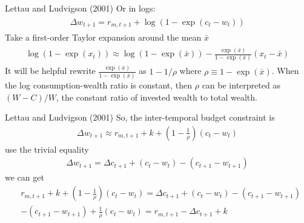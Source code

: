 \documentclass{beamer}
\begin{document}
\begin{frame}{Lettau and Ludvigson (2001)}
	Or in logs:
	\begin{align}
		\begin{aligned}
			\Delta w_{t+1}  =r_{m, t+1}+\log \left(1-\exp \left(c_{t}-w_{t}\right)\right)
		\end{aligned}
	\end{align}
	Take a first-order Taylor expansion around the mean $ \bar{x} $
	\begin{align}
		\begin{array}{l}
			\log \left(1-\exp \left(x_{t}\right)\right) \approx \log (1-\exp (\bar{x})) 
			-\frac{\exp (\bar{x})}{1-\exp (\bar{x})}\left(x_{t}-\bar{x}\right)
		\end{array}
	\end{align}
	It will be helpful rewrite $\frac{\exp (\bar{x})}{1-\exp (\bar{x})}$ as $ 1-1/\rho $ where $\rho \equiv 1 -  \exp (\bar{x})$. When the log consumption-wealth ratio is constant, then $ \rho $ can be interpreted as $ (W - C)/ W $, the constant ratio of invested wealth to total wealth.
\end{frame}

\begin{frame}{Lettau and Ludvigson (2001)}
	So, the inter-temporal budget constraint is
	\begin{align}
		\Delta w_{t+1} \approx r_{m,t+1}+k+\left(1-\frac{1}{\rho}\right)\left(c_{t}-w_{t}\right)
	\end{align}
	use the trivial equality
	\begin{align}
		\Delta w_{t+1}= \Delta c_{t+1}+\left(c_{t}-w_{t}\right)  -\left(c_{t+1}-w_{t+1}\right)
	\end{align}
	we can get
	\begin{align}
		&r_{m,t+1}+k+\left(1-\frac{1}{\rho}\right)\left(c_{t}-w_{t}\right) = \Delta c_{t+1}+\left(c_{t}-w_{t}\right)  -\left(c_{t+1}-w_{t+1}\right)\\
		&-\left(c_{t+1}-w_{t+1}\right)+\frac{1}{\rho}\left(c_{t}-w_{t}\right)=r_{m, t+1}-\Delta c_{t+1}+k
	\end{align}
\end{frame}
\end{document}
